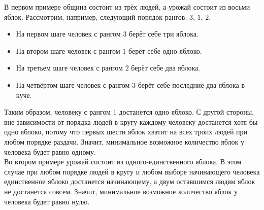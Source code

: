 \begin{problem}
\Explanation

В первом примере община состоит из трёх людей, а урожай состоит из восьми яблок. Рассмотрим, например, следующий порядок рангов: $3$, $1$, $2$.

\begin{itemize}
    \item На первом шаге человек с рангом $3$ берёт себе три яблока.
    \item На втором шаге человек с рангом $1$ берёт себе одно яблоко.
    \item На третьем шаге человек с рангом $2$ берёт себе два яблока.
    \item На четвёртом шаге человек с рангом $3$ берёт себе последние два яблока в куче.
\end{itemize}


Таким образом, человеку с рангом $1$ достанется одно яблоко. С другой стороны, вне зависимости от порядка людей в кругу каждому человеку достанется хотя бы одно яблоко, потому что первых шести яблок хватит на всех троих людей при любом порядке раздачи. Значит, минимальное возможное количество яблок у человека будет равно одному.\\

Во втором примере урожай состоит из одного-единственного яблока. В этом случае при любом порядке людей в кругу и любом выборе начинающего человека единственное яблоко достанется начинающему, а двум оставшимся людям яблок не достанется совсем. Значит, минимальное возможное количество яблок у человека будет равно нулю.

\end{problem}